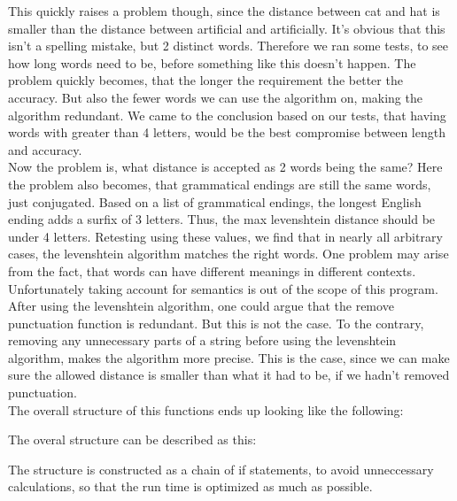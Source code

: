 This quickly raises a problem though, since the distance between cat and hat is smaller than the distance
between artificial and artificially. 
It's obvious that this isn't a spelling mistake, but 2 distinct words. Therefore we ran
some tests, to see how long words need to be, before something like this doesn't happen. 
The problem quickly becomes, that the longer the requirement the better the accuracy. 
But also the fewer words we can use the algorithm on, making the algorithm redundant.
We came to the conclusion based on our tests, that having words with greater than 4 letters, would be
the best compromise between length and accuracy.
\\
Now the problem is, what distance is accepted as 2 words being the same?
Here the problem also becomes, that grammatical endings are still the same words, just conjugated.
Based on a list of grammatical endings, the longest English ending adds a surfix of 3 letters\cite{grammar_endings}. Thus,
the max levenshtein distance should be under 4 letters.
Retesting using these values, we find that in nearly all arbitrary cases, the levenshtein algorithm matches the right words.
One problem may arise from the fact, that words can have different meanings in different contexts. Unfortunately taking account for semantics is out of the scope of this program.
\\
After using the levenshtein algorithm, one could argue that the remove punctuation function is redundant. But this is not the case. To the contrary, removing any
unnecessary parts of a string before using the levenshtein algorithm, makes the algorithm more precise. This is the case, since we can make sure the allowed distance
is smaller than what it had to be, if we hadn't removed punctuation.
\\
The overall structure of this functions ends up looking like the following: 

The overal structure can be described as this:


The structure is constructed as a chain of if statements, to avoid unneccessary
calculations, so that the run time is optimized as much as possible.
